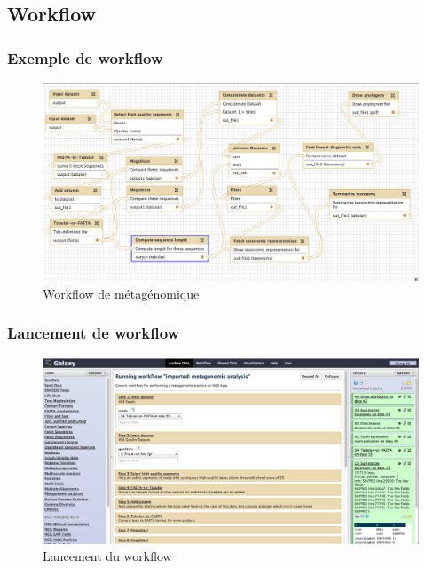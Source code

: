 \documentclass[12pt]{beamer}
\begin{document}
\subsection{Workflow}
\begin{frame}
\frametitle{Exemple de workflow}
\begin{figure}
   \begin{center}
 \includegraphics[scale=0.23]{img/workflow1.png}
 	\caption{Workflow de métagénomique}
   \end{center}
  \end{figure}
\end{frame}

\begin{frame}
\frametitle{Lancement de workflow}
\begin{figure}
   \begin{center}
 \includegraphics[scale=0.2]{img/preRun.png}
 	\caption{Lancement du workflow}
   \end{center}
  \end{figure}
\end{frame}
\end{document}
